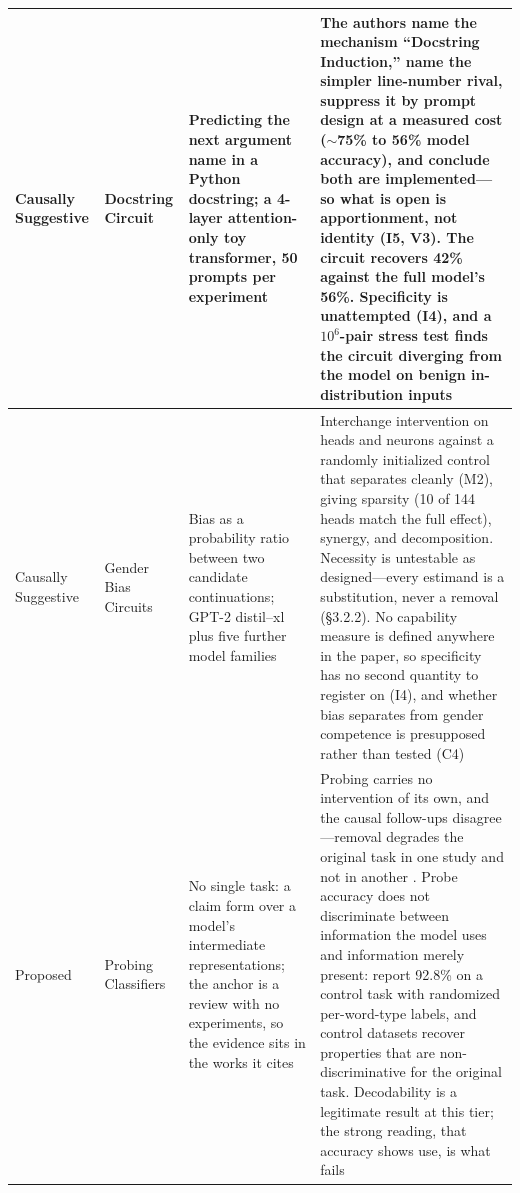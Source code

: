 \documentclass{article}
\begin{document}
{\begin{longtable}{@{}>{\raggedright\arraybackslash}p{2.2cm}>{\raggedright\arraybackslash}p{2.2cm}>{\raggedright\arraybackslash}p{3.4cm}>{\raggedright\arraybackslash}p{7.4cm}@{}}
Causally Suggestive & Docstring Circuit \citep{heimersheim2023docstring} & Predicting the next argument name in a Python docstring; a 4-layer attention-only toy transformer, 50 prompts per experiment & The authors name the mechanism ``Docstring Induction,'' name the simpler line-number rival, suppress it by prompt design at a measured cost ($\sim$75\% to 56\% model accuracy), and conclude both are implemented---so what is open is apportionment, not identity (I5, V3). The circuit recovers 42\% against the full model's 56\%. Specificity is unattempted (I4), and a $10^6$-pair stress test finds the circuit diverging from the model on benign in-distribution inputs \citep{uitdebos2024adversarial} \\
\midrule
Causally Suggestive & Gender Bias Circuits \citep{vig2020gender} & Bias as a probability ratio between two candidate continuations; GPT-2 distil--xl plus five further model families & Interchange intervention on heads and neurons against a randomly initialized control that separates cleanly (M2), giving sparsity (10 of 144 heads match the full effect), synergy, and decomposition. Necessity is untestable as designed---every estimand is a substitution, never a removal (\S3.2.2). No capability measure is defined anywhere in the paper, so specificity has no second quantity to register on (I4), and whether bias separates from gender competence is presupposed rather than tested (C4) \\
\midrule
Proposed & Probing Classifiers \citep{belinkov2022probing} & No single task: a claim form over a model's intermediate representations; the anchor is a review with no experiments, so the evidence sits in the works it cites & Probing carries no intervention of its own, and the causal follow-ups disagree---removal degrades the original task in one study and not in another \citep{elazar2021amnesic}. Probe accuracy does not discriminate between information the model uses and information merely present: \citet{hewitt2019designing} report 92.8\% on a control task with randomized per-word-type labels, and control datasets recover properties that are non-discriminative for the original task. Decodability is a legitimate result at this tier; the strong reading, that accuracy shows use, is what fails \\
\midrule

\end{longtable}}
\end{document}
